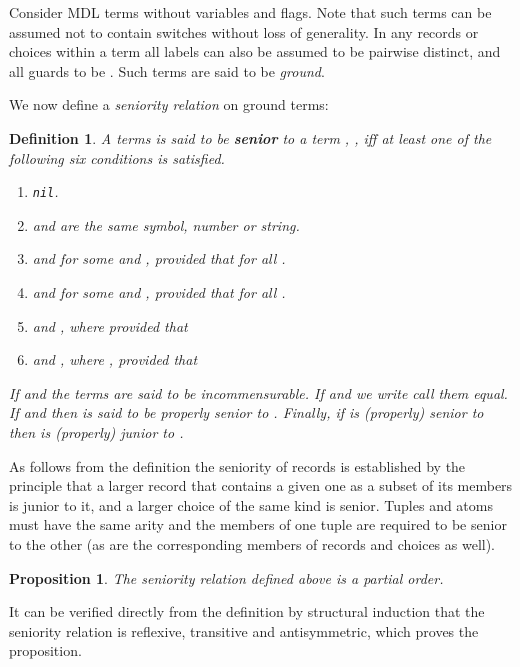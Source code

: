 \documentclass[11pt]{report}
\newtheorem*{mydef}{Definition}
\begin{document}
Consider MDL terms without variables and flags. Note that such terms can be assumed not to contain switches without
loss of generality. In any records or choices within a term all labels can also be assumed to be pairwise distinct, and all guards to be \true. Such terms are said to be {\em ground}.

We now define a {\em seniority relation} on ground terms:

\begin{mydef}
A terms  is said to be {\em\bf senior} to a term , , iff at least one of the following six conditions is satisfied.
\begin{enumerate}

\item \verb"nil".

\item  and  are the same symbol, number or string.

\item  and  for some  and
,  provided that for all  .


\item  and  for some  and
,  provided that for all  .

\item  and , where  provided that


\item 
and ,
where , provided that


\end{enumerate}

If  and  the terms are said to be incommensurable.
If  and  we write  call them equal.
If  and  then  is said to be {\em properly senior} to .
Finally, if  is (properly) senior to  then  is (properly) junior to . 
\end{mydef}

As follows from the definition the seniority of records is established by the principle that a larger record that contains a given one as a subset of its members is junior to it, and a larger choice of the same kind is senior. Tuples and atoms must have the same arity and the members of one tuple are required to be senior to the other (as are the corresponding members of records and choices as well).

\newtheorem{prop}{Proposition}
\begin{prop}
The seniority relation  defined above is a partial order.
\end{prop}
It can be verified directly from the definition by structural induction that the seniority relation is reflexive, transitive and antisymmetric, which proves the proposition.
\end{document}
